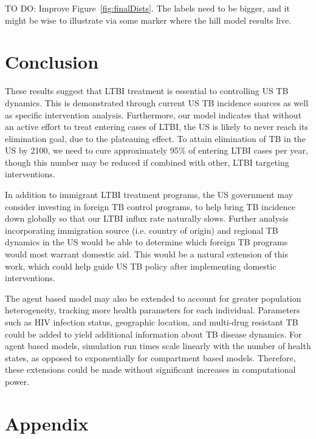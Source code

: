 \documentclass{amsart}
\renewcommand{\(}{\left(}
\renewcommand{\)}{\right)}
\newcommand{\TODO}[1]{\begin{framed}{\huge \color{red} TO DO:}
  #1 \end{framed}}
\begin{document}
\TODO{Improve Figure~\ref{fig:finalDists}. The labels need to be bigger, and it
might be wise to illustrate via some marker where the hill model results live.}

\section{Conclusion}
These results suggest that  LTBI treatment is essential to
controlling US TB dynamics. This is demonstrated through current US TB incidence
sources as well as specific intervention analysis. 
Furthermore, our model indicates that without an active effort to treat
entering cases of LTBI, the US is likely to never reach its elimination goal, due to the plateauing
effect. To attain elimination of TB in the US by 2100, we need to cure approximately
95\% of entering LTBI cases per year, though this number may be reduced if
combined with other, LTBI targeting interventions. 

In addition to immigrant LTBI treatment programs, the US government may consider
investing in foreign TB control programs, to help bring TB incidence down
globally so that our LTBI influx rate naturally slows. Further analysis
incorporating immigration source (i.e. country of origin) and regional TB
dynamics in the US would be able to determine which foreign TB programs would
most warrant domestic aid. This would be a natural extension of this work,
which could help guide US TB policy after implementing domestic interventions.  

The agent based model may also be extended to account for greater population
heterogeneity, tracking more health parameters for each individual.
Parameters such as HIV infection status, geographic location, and multi-drug
resistant TB could be added to yield additional information about TB disease dynamics.
For agent based models, simulation run times scale linearly with the number of health
states, as opposed to exponentially for compartment based models. Therefore,
these extensions could be made without significant increases in computational power.

\section{Appendix} 
\end{document}
